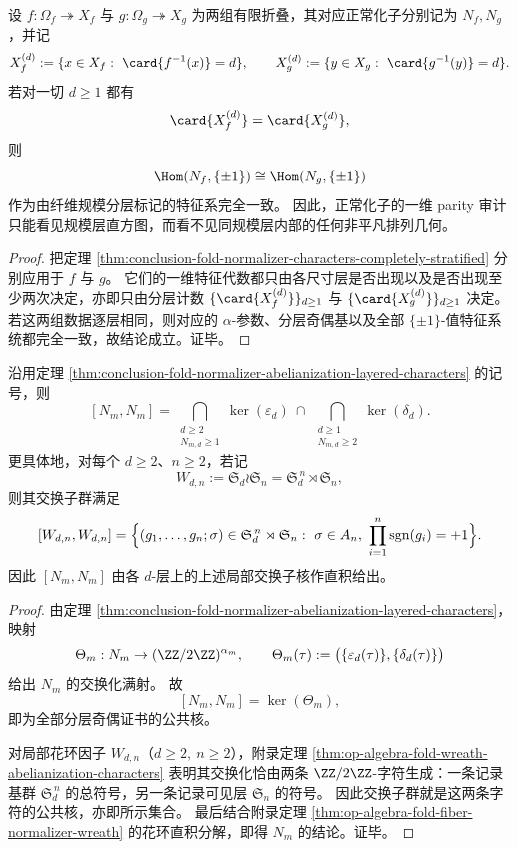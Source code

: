\begin{corollary}[分层奇偶可见量的统计盲性]\label{cor:conclusion-fold-normalizer-layered-character-histogram-blindness}
设 \(f:\Omega_f\twoheadrightarrow X_f\) 与 \(g:\Omega_g\twoheadrightarrow X_g\) 为两组有限折叠，其对应正常化子分别记为 \(N_f,N_g\)，并记
\[
X_f^{(d)}:=\{x\in X_f:\ \card{f^{-1}(x)}=d\},
\qquad
X_g^{(d)}:=\{y\in X_g:\ \card{g^{-1}(y)}=d\}.
\]
若对一切 \(d\ge 1\) 都有
\[
\card{X_f^{(d)}}=\card{X_g^{(d)}},
\]
则
\[
\Hom(N_f,\{\pm1\})\cong \Hom(N_g,\{\pm1\})
\]
作为由纤维规模分层标记的特征系完全一致。
因此，正常化子的一维 parity 审计只能看见规模层直方图，而看不见同规模层内部的任何非平凡排列几何。
\end{corollary}
\begin{proof}
把定理 \ref{thm:conclusion-fold-normalizer-characters-completely-stratified} 分别应用于 \(f\) 与 \(g\)。
它们的一维特征代数都只由各尺寸层是否出现以及是否出现至少两次决定，亦即只由分层计数
\(
\{\card{X_f^{(d)}}\}_{d\ge 1}
\)
与
\(
\{\card{X_g^{(d)}}\}_{d\ge 1}
\)
决定。
若这两组数据逐层相同，则对应的 \(\alpha\)-参数、分层奇偶基以及全部 \(\{\pm1\}\)-值特征系统都完全一致，故结论成立。证毕。
\end{proof}

\begin{proposition}[交换子群作为全部分层奇偶证书的公共核]\label{prop:conclusion-fold-normalizer-commutator-kernel}
沿用定理 \ref{thm:conclusion-fold-normalizer-abelianization-layered-characters} 的记号，则
\[
[N_m,N_m]
=
\bigcap_{\substack{d\ge 2\\ N_{m,d}\ge 1}}\ker(\varepsilon_d)
\ \cap\
\bigcap_{\substack{d\ge 1\\ N_{m,d}\ge 2}}\ker(\delta_d).
\]
更具体地，对每个 \(d\ge 2\)、\(n\ge 2\)，若记
\[
W_{d,n}:=\mathfrak S_d\wr \mathfrak S_n=\mathfrak S_d^{\,n}\rtimes \mathfrak S_n,
\]
则其交换子群满足
\[
[W_{d,n},W_{d,n}]
=
\Bigl\{
(g_1,\dots,g_n;\sigma)\in \mathfrak S_d^{\,n}\rtimes \mathfrak S_n:
\ \sigma\in A_n,\ 
\prod_{i=1}^{n}\operatorname{sgn}(g_i)=+1
\Bigr\}.
\]
因此 \([N_m,N_m]\) 由各 \(d\)-层上的上述局部交换子核作直积给出。
\end{proposition}
\begin{proof}
由定理 \ref{thm:conclusion-fold-normalizer-abelianization-layered-characters}，映射
\[
\Theta_m:N_m\to (\ZZ/2\ZZ)^{\alpha_m},
\qquad
\Theta_m(\tau):=\bigl(\{\varepsilon_d(\tau)\},\{\delta_d(\tau)\}\bigr)
\]
给出 \(N_m\) 的交换化满射。
故
\[
[N_m,N_m]=\ker(\Theta_m),
\]
即为全部分层奇偶证书的公共核。

对局部花环因子 \(W_{d,n}\)（\(d\ge 2,\ n\ge 2\)），附录定理 \ref{thm:op-algebra-fold-wreath-abelianization-characters} 表明其交换化恰由两条 \(\ZZ/2\ZZ\)-字符生成：一条记录基群 \(\mathfrak S_d^{\,n}\) 的总符号，另一条记录可见层 \(\mathfrak S_n\) 的符号。
因此交换子群就是这两条字符的公共核，亦即所示集合。
最后结合附录定理 \ref{thm:op-algebra-fold-fiber-normalizer-wreath} 的花环直积分解，即得 \(N_m\) 的结论。证毕。
\end{proof}

